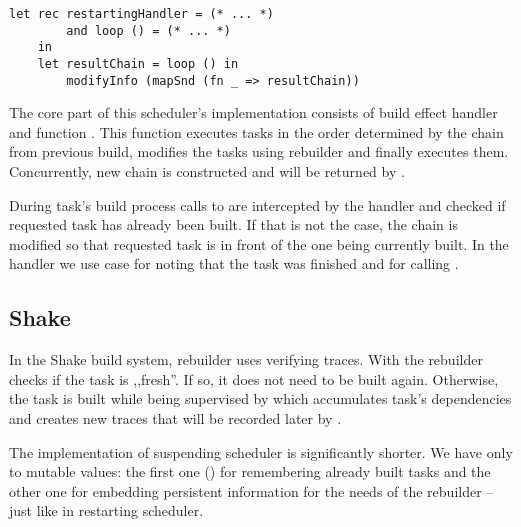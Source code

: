 
\vspace{-1.25em}
\begin{lstlisting}[style=Haleff-long]
    let rec restartingHandler = (* ... *)
        and loop () = (* ... *)
    in
    let resultChain = loop () in
        modifyInfo (mapSnd (fn _ => resultChain))
\end{lstlisting}

The core part of this scheduler's implementation consists of build effect handler  and function . This function executes tasks in the order determined by the chain from previous build, modifies the tasks using rebuilder and finally executes them. Concurrently, new chain is constructed and will be returned by .



During task's build process calls to  are intercepted by the handler and checked if requested task has already been built. If that is not the case, the chain is modified so that requested task is in front of the one being currently built. In the handler we use  case for noting that the task was finished and for calling .

\subsection{Shake}



In the Shake build system, rebuilder uses verifying traces. With  the rebuilder checks if the task is ,,fresh''. If so, it does not need to be built again. Otherwise, the task is built while being supervised by  which accumulates task's dependencies and creates new traces that will be recorded later by .

\pagebreak



The implementation of suspending scheduler is significantly shorter. We have only to mutable values: the first one () for remembering already built tasks and the other one for embedding persistent information for the needs of the rebuilder -- just like in restarting scheduler.

